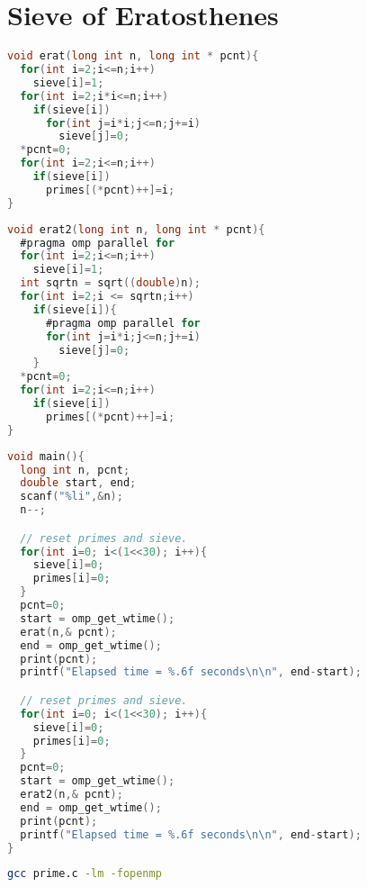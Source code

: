 \documentclass[12pt]{article}
\begin{document}
\section*{Sieve of Eratosthenes}
\begin{lstlisting}[frame=single,language=C,caption=Non-parallelized Sieve of Eratosthenes (prime.c) \label{code:prime-sieve-nonparallelized}]
void erat(long int n, long int * pcnt){
  for(int i=2;i<=n;i++)
    sieve[i]=1;
  for(int i=2;i*i<=n;i++)
    if(sieve[i])
      for(int j=i*i;j<=n;j+=i)
        sieve[j]=0;
  *pcnt=0;
  for(int i=2;i<=n;i++)
    if(sieve[i])
      primes[(*pcnt)++]=i; 
}
\end{lstlisting}
\begin{lstlisting}[frame=single,language=C,caption=Parllelized Sieve of Eratosthenes (prime.c) \label{code:prime-sieve-parallelized}]
void erat2(long int n, long int * pcnt){
  #pragma omp parallel for
  for(int i=2;i<=n;i++)
    sieve[i]=1;
  int sqrtn = sqrt((double)n);
  for(int i=2;i <= sqrtn;i++)
    if(sieve[i]){
      #pragma omp parallel for
      for(int j=i*i;j<=n;j+=i)
        sieve[j]=0;
    }
  *pcnt=0;
  for(int i=2;i<=n;i++)
    if(sieve[i])
      primes[(*pcnt)++]=i; 
}
\end{lstlisting}
\newpage
\begin{lstlisting}[frame=single,language=C,caption=Measuring Runtime Performance (prime.c) \label{code:prime-sieve-runtime}]
void main(){
  long int n, pcnt;
  double start, end;
  scanf("%li",&n);
  n--;

  // reset primes and sieve.
  for(int i=0; i<(1<<30); i++){
    sieve[i]=0;
    primes[i]=0;
  }
  pcnt=0;
  start = omp_get_wtime();
  erat(n,& pcnt);
  end = omp_get_wtime();
  print(pcnt);
  printf("Elapsed time = %.6f seconds\n\n", end-start);

  // reset primes and sieve.
  for(int i=0; i<(1<<30); i++){
    sieve[i]=0;
    primes[i]=0;
  }
  pcnt=0;
  start = omp_get_wtime();
  erat2(n,& pcnt);
  end = omp_get_wtime();
  print(pcnt);
  printf("Elapsed time = %.6f seconds\n\n", end-start);
}
\end{lstlisting}
\begin{lstlisting}[frame=single,language=Bash,caption=Output in Terminal from prime sieve program (prime.c) \label{code:prime-sieve-terminal-output}]
 gcc prime.c -lm -fopenmp
\end{lstlisting}
\newpage
\end{document}
